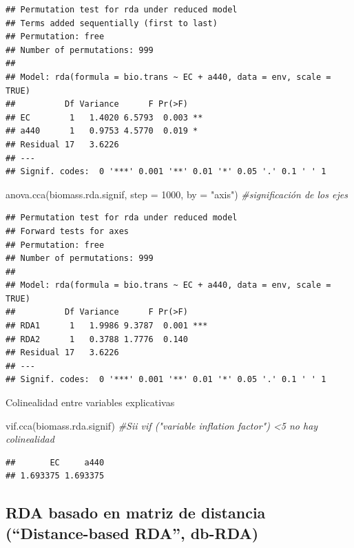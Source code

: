 \documentclass[
]{book}
\newenvironment{Shaded}{\begin{snugshade}}{\end{snugshade}}
\newcommand{\AttributeTok}[1]{\textcolor[rgb]{0.77,0.63,0.00}{#1}}
\newcommand{\CommentTok}[1]{\textcolor[rgb]{0.56,0.35,0.01}{\textit{#1}}}
\newcommand{\DecValTok}[1]{\textcolor[rgb]{0.00,0.00,0.81}{#1}}
\newcommand{\FunctionTok}[1]{\textcolor[rgb]{0.00,0.00,0.00}{#1}}
\newcommand{\NormalTok}[1]{#1}
\newcommand{\StringTok}[1]{\textcolor[rgb]{0.31,0.60,0.02}{#1}}
\begin{document}
\begin{verbatim}
## Permutation test for rda under reduced model
## Terms added sequentially (first to last)
## Permutation: free
## Number of permutations: 999
## 
## Model: rda(formula = bio.trans ~ EC + a440, data = env, scale = TRUE)
##          Df Variance      F Pr(>F)   
## EC        1   1.4020 6.5793  0.003 **
## a440      1   0.9753 4.5770  0.019 * 
## Residual 17   3.6226                 
## ---
## Signif. codes:  0 '***' 0.001 '**' 0.01 '*' 0.05 '.' 0.1 ' ' 1
\end{verbatim}

\begin{Shaded}
\begin{Highlighting}[]
\FunctionTok{anova.cca}\NormalTok{(biomass.rda.signif, }\AttributeTok{step =} \DecValTok{1000}\NormalTok{, }\AttributeTok{by =} \StringTok{"axis"}\NormalTok{) }\CommentTok{\#significación de los ejes}
\end{Highlighting}
\end{Shaded}

\begin{verbatim}
## Permutation test for rda under reduced model
## Forward tests for axes
## Permutation: free
## Number of permutations: 999
## 
## Model: rda(formula = bio.trans ~ EC + a440, data = env, scale = TRUE)
##          Df Variance      F Pr(>F)    
## RDA1      1   1.9986 9.3787  0.001 ***
## RDA2      1   0.3788 1.7776  0.140    
## Residual 17   3.6226                  
## ---
## Signif. codes:  0 '***' 0.001 '**' 0.01 '*' 0.05 '.' 0.1 ' ' 1
\end{verbatim}

Colinealidad entre variables explicativas

\begin{Shaded}
\begin{Highlighting}[]
\FunctionTok{vif.cca}\NormalTok{(biomass.rda.signif) }\CommentTok{\#Sii vif ("variable inflation factor") \textless{}5 no hay colinealidad}
\end{Highlighting}
\end{Shaded}

\begin{verbatim}
##       EC     a440 
## 1.693375 1.693375
\end{verbatim}

\hypertarget{rda-basado-en-matriz-de-distancia-distance-based-rda-db-rda}{%
\subsection{RDA basado en matriz de distancia (``Distance-based RDA'', db-RDA)}\label{rda-basado-en-matriz-de-distancia-distance-based-rda-db-rda}}
\end{document}
